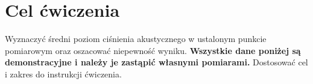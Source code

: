 \section{Cel ćwiczenia}
\label{sec:cel}
Wyznaczyć średni poziom ciśnienia akustycznego w ustalonym punkcie
pomiarowym oraz oszacować niepewność wyniku.
\textbf{Wszystkie dane poniżej są demonstracyjne i należy je zastąpić
własnymi pomiarami.} Dostosować cel i zakres do instrukcji ćwiczenia.
